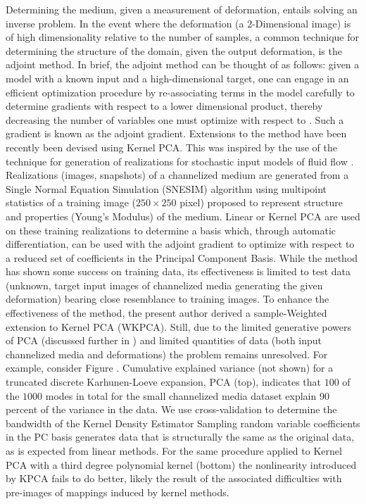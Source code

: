 \documentclass{article}
\begin{document}
    Determining the medium, given a measurement of deformation, entails solving an inverse problem. In the event where the deformation (a 2-Dimensional image) is of high dimensionality relative to the number of samples, a common technique for determining the structure of the domain, given the output deformation, is the adjoint method.  
	In brief, the adjoint method can be thought of as follows: given a model with a known input and a high-dimensional target, one can engage in an efficient optimization procedure by re-associating terms in the model carefully to determine gradients with respect to a lower dimensional product, thereby decreasing the number of variables one must optimize with respect to \cite{Oberai2003SolutionMethod}.  Such a gradient is known as the adjoint gradient.
Extensions to the method have been recently been devised using Kernel PCA.  This was inspired by the use of the technique for generation of realizations for stochastic input models of fluid flow \cite{Ma2011KernelGeneration}.  Realizations (images, snapshots) of a channelized medium are generated from a Single Normal Equation Simulation (SNESIM) algorithm using multipoint statistics of a training image ($250 \times 250$ pixel) proposed to represent structure and properties (Young's Modulus) of the medium.  Linear or Kernel PCA are used on these training realizations to determine a basis which, through automatic differentiation, can be used with the adjoint gradient to optimize with respect to a reduced set of coefficients in the Principal Component Basis.  While the method has shown some success on training data, its effectiveness is limited to test data (unknown, target input images of channelized media generating the given deformation) bearing close resemblance to training images.
	To enhance the effectiveness of the method, the present author derived a sample-Weighted extension to Kernel PCA (WKPCA).  Still, due to the limited generative powers of PCA (discussed further in \label{related}) and limited quantities of data (both input channelized media and deformations) the problem remains unresolved.  For example, consider Figure \label{KDEPCA}.  Cumulative explained variance (not shown) for a truncated discrete Karhunen-Loeve expansion, PCA (top), indicates that $100$ of the $1000$ modes in total for the small channelized media dataset explain 90 percent of the variance in the data.  We use cross-validation to determine the bandwidth of the Kernel Density Estimator  Sampling random variable coefficients in the PC basis generates data that is structurally the same as the original data, as is expected from linear methods.  For the same procedure applied to Kernel PCA with a third degree polynomial kernel (bottom) the nonlinearity introduced by KPCA fails to do better, likely the result of the associated difficulties with pre-images of mappings induced by kernel methods.
\end{document}
